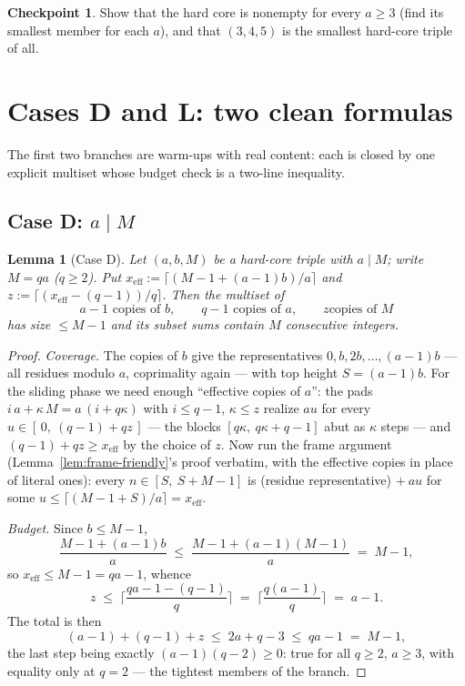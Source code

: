 \documentclass[11pt,reqno]{amsart}
\theoremstyle{plain}
\newtheorem{lemma}[theorem]{Lemma}
\theoremstyle{definition}
\newtheorem{checkpoint}[theorem]{Checkpoint}   %
\theoremstyle{remark}
\begin{document}
\begin{checkpoint}
Show that the hard core is nonempty for every $a \ge 3$ (find its smallest member
for each $a$), and that $(3,4,5)$ is the smallest hard-core triple of all.
\end{checkpoint}


\section{Cases D and L: two clean formulas}\label{sec:caseDL}

The first two branches are warm-ups with real content: each is closed by one
explicit multiset whose budget check is a two-line inequality.

\subsection{Case D: \texorpdfstring{$a \mid M$}{a divides M}}

\begin{lemma}[Case D]\label{lem:caseD-friendly}
Let $(a, b, M)$ be a hard-core triple with $a \mid M$; write $M = qa$ ($q \ge 2$).
Put $x_{\mathrm{eff}} := \lceil (M - 1 + (a-1)b)/a \rceil$ and
$z := \lceil (x_{\mathrm{eff}} - (q-1))/q \rceil$. Then the multiset of
\[
  a - 1 \text{ copies of } b, \qquad q - 1 \text{ copies of } a, \qquad z \text{
  copies of } M
\]
has size $\le M - 1$ and its subset sums contain $M$ consecutive integers.
\end{lemma}

\begin{proof}
\emph{Coverage.} The copies of $b$ give the representatives $0, b, 2b, \dots,
(a-1)b$ --- all residues modulo $a$, coprimality again --- with top height $S =
(a-1)b$. For the sliding phase we need enough ``effective copies of $a$'': the
pads $i\,a + \kappa\,M = a\,(i + q\kappa)$ with $i \le q - 1$, $\kappa \le z$
realize $a u$ for every $u \in [\,0,\ (q-1) + qz\,]$ --- the blocks $[q\kappa,\
q\kappa + q - 1]$ abut as $\kappa$ steps --- and $(q-1) + qz \ge x_{\mathrm{eff}}$
by the choice of $z$. Now run the frame argument
(Lemma~\ref{lem:frame-friendly}'s proof verbatim, with the effective copies in
place of literal ones): every $n \in [S,\ S + M - 1]$ is (residue representative)
$+\ a u$ for some $u \le \lceil (M - 1 + S)/a \rceil = x_{\mathrm{eff}}$.

\emph{Budget.} Since $b \le M - 1$,
\[
  \frac{M - 1 + (a-1)b}{a} \;\le\; \frac{M - 1 + (a-1)(M-1)}{a} \;=\; M - 1 ,
\]
so $x_{\mathrm{eff}} \le M - 1 = qa - 1$, whence
\[
  z \;\le\; \Big\lceil \frac{qa - 1 - (q-1)}{q} \Big\rceil
    \;=\; \Big\lceil \frac{q(a-1)}{q} \Big\rceil \;=\; a - 1 .
\]
The total is then
\[
  (a-1) + (q-1) + z \;\le\; 2a + q - 3 \;\le\; qa - 1 \;=\; M - 1 ,
\]
the last step being exactly $(a-1)(q-2) \ge 0$: true for all $q \ge 2$, $a \ge 3$,
with equality only at $q = 2$ --- the tightest members of the branch.
\end{proof}
\end{document}
